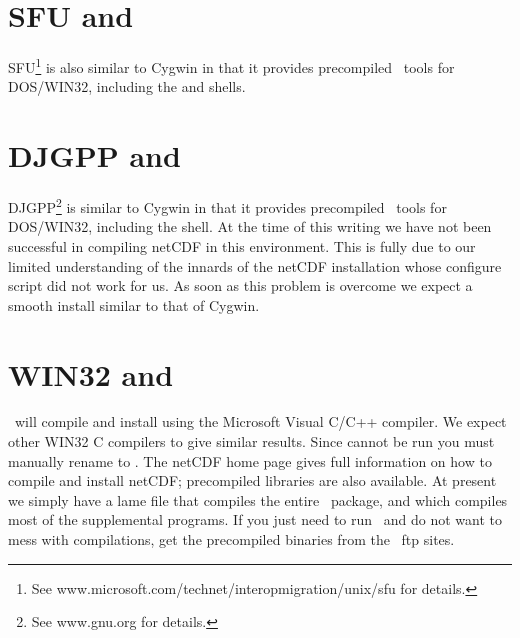 
\section{SFU and \gmt}

SFU\footnote{See www.microsoft.com/technet/interopmigration/unix/sfu for details.} is also similar to Cygwin
in that it provides precompiled \UNIX\ tools for DOS/WIN32,
including the  and  shells.

\section{DJGPP and \gmt}

DJGPP\footnote{See www.gnu.org for details.} is similar to Cygwin
in that it provides precompiled \UNIX\ tools for DOS/WIN32,
including the  shell.  At the time of this writing we
have not been successful in compiling netCDF in this
environment.  This is fully due to our limited understanding
of the innards of the netCDF installation whose configure
script did not work for us.  As soon as this problem is
overcome we expect a smooth install similar to that of Cygwin.

\section{WIN32 and \gmt}

\GMT\ will compile and install using the Microsoft Visual C/C++
compiler.  We expect other WIN32 C compilers to give similar
results.  Since  cannot be run you
must manually rename  to
.  The netCDF home page gives full
information on how to compile and install netCDF; precompiled
libraries are also available.  At present we simply have a lame 
file that compiles the entire \GMT\
package, and  which compiles most of the
supplemental programs.  If you just need to run \GMT\ and do not want to mess with compilations,
get the precompiled binaries from the \GMT\ ftp sites.



